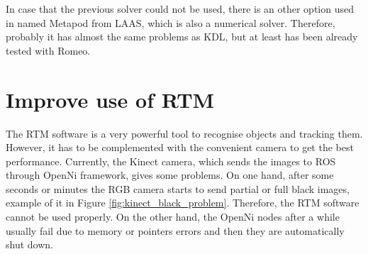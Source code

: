 \documentclass[12pt,a4paper,final,twoside,openright]{report}
\begin{document}
In case that the previous solver could not be used, there is an other option used in \cite{claudio:hal-01159882} named Metapod from LAAS, which is also a numerical solver. Therefore, probably it has almost the same problems as KDL, but at least has been already tested with Romeo.  

\section{Improve use of RTM}

The RTM software is a very powerful tool to recognise objects and tracking them. However, it has to be complemented with the convenient camera to get the best performance. Currently, the Kinect camera, which sends the images to ROS through OpenNi framework, gives some problems. On one hand, after some seconds or minutes the RGB camera starts to send partial or full black images, example of it in Figure \ref{fig:kinect_black_problem}. Therefore, the RTM software cannot be used properly. On the other hand, the OpenNi nodes after a while usually fail due to memory or pointers errors and then they are automatically shut down.
\end{document}

